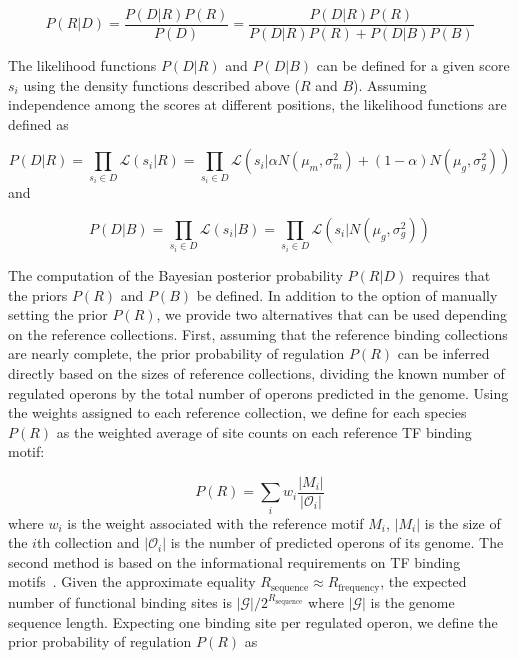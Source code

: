 \begin{equation}
P(R|D) = \frac{P(D|R)P(R)}{P(D)} = \frac{P(D|R)P(R)}{P(D|R)P(R) + P(D|B)P(B)}
\end{equation}

The likelihood functions $P(D|R)$ and $P(D|B)$ can be defined for a given score
$s_i$ using the density functions described above ($R$ and $B$). Assuming
independence among the scores at different positions, the likelihood functions
are defined as

\begin{equation}
  P(D|R) = \prod_{s_i \in D} \mathcal{L}(s_i|R) =
  \prod_{s_i \in D} \mathcal{L}(s_i | \alpha N(\mu_m, \sigma_m^2) + (1-\alpha)N(\mu_g,\sigma_g^2))
\end{equation}
and

\begin{equation}
  P(D|B) = \prod_{s_i \in D} \mathcal{L}(s_i|B) = \prod_{s_i \in D} \mathcal{L}(s_i | N(\mu_g, \sigma_g^2))
\end{equation}

The computation of the Bayesian posterior probability $P(R|D)$ requires that
the priors $P(R)$ and $P(B)$ be defined. In addition to the option of manually
setting the prior $P(R)$, we provide two alternatives that can be used
depending on the reference collections. First, assuming that the reference
binding collections are nearly complete, the prior probability of regulation
$P(R)$ can be inferred directly based on the sizes of reference collections,
dividing the known number of regulated operons by the total number of operons
predicted in the genome. Using the weights assigned to each reference
collection, we define for each species $P(R)$ as the weighted average of site counts on each
reference TF binding motif:

\begin{equation}
P(R) = \sum_i w_i \frac{|M_i|}{|\mathcal{O}_i|}
\end{equation}
where $w_i$ is the weight associated with the reference motif $M_i$, $|M_i|$ is
the size of the $i$th collection and $|\mathcal{O}_i|$ is the number of
predicted operons of its genome. The second method is based on the
informational requirements on TF binding motifs~\cite{schneider1986information,
  schneider2000evolution, o2014informational}. Given the approximate equality
$R_{\mathrm{sequence}} \approx R_{\mathrm{frequency}}$, the expected number of
functional binding sites is $|\mathcal{G}| / 2^{R_{\mathrm{sequence}}}$ where
$|\mathcal{G}|$ is the genome sequence length. Expecting one binding site per
regulated operon, we define the prior probability of regulation $P(R)$ as

